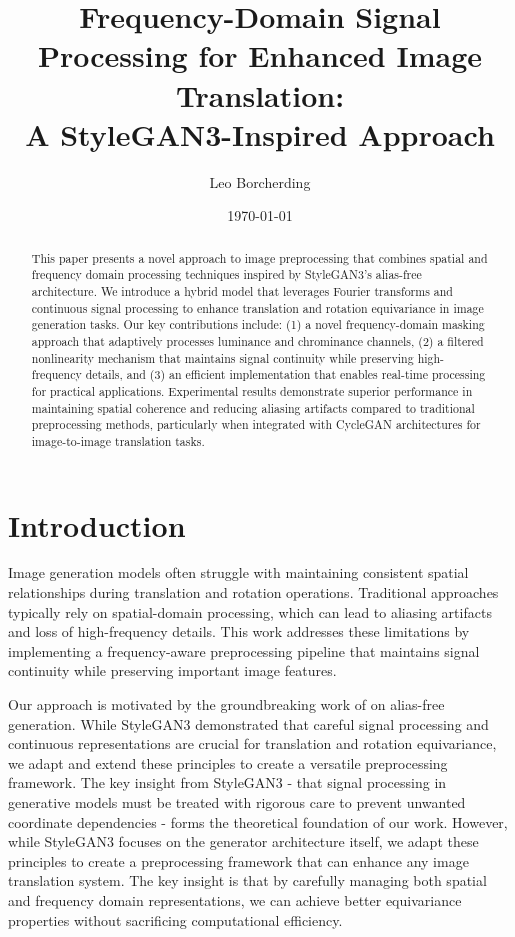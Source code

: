 \documentclass{article}
\title{Frequency-Domain Signal Processing for Enhanced Image Translation: \\
A StyleGAN3-Inspired Approach}
\author{Leo Borcherding}
\date{\today}
\begin{document}
\maketitle

\begin{abstract}
This paper presents a novel approach to image preprocessing that combines spatial and frequency domain processing techniques inspired by StyleGAN3's alias-free architecture. We introduce a hybrid model that leverages Fourier transforms and continuous signal processing to enhance translation and rotation equivariance in image generation tasks. Our key contributions include: (1) a novel frequency-domain masking approach that adaptively processes luminance and chrominance channels, (2) a filtered nonlinearity mechanism that maintains signal continuity while preserving high-frequency details, and (3) an efficient implementation that enables real-time processing for practical applications. Experimental results demonstrate superior performance in maintaining spatial coherence and reducing aliasing artifacts compared to traditional preprocessing methods, particularly when integrated with CycleGAN architectures for image-to-image translation tasks.
\end{abstract}

\section{Introduction}
Image generation models often struggle with maintaining consistent spatial relationships during translation and rotation operations. Traditional approaches typically rely on spatial-domain processing, which can lead to aliasing artifacts and loss of high-frequency details. This work addresses these limitations by implementing a frequency-aware preprocessing pipeline that maintains signal continuity while preserving important image features.

Our approach is motivated by the groundbreaking work of \cite{stylegan3} on alias-free generation. While StyleGAN3 demonstrated that careful signal processing and continuous representations are crucial for translation and rotation equivariance, we adapt and extend these principles to create a versatile preprocessing framework. The key insight from StyleGAN3 - that signal processing in generative models must be treated with rigorous care to prevent unwanted coordinate dependencies - forms the theoretical foundation of our work. However, while StyleGAN3 focuses on the generator architecture itself, we adapt these principles to create a preprocessing framework that can enhance any image translation system. The key insight is that by carefully managing both spatial and frequency domain representations, we can achieve better equivariance properties without sacrificing computational efficiency.
\end{document}
